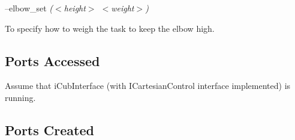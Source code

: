 --elbow\+\_\+set {\itshape ($<$height$>$ $<$weight$>$)}
\begin{DoxyItemize}
\item To specify how to weigh the task to keep the elbow high.
\end{DoxyItemize}\hypertarget{group__karmaToolFinder_portsa_sec}{}\subsection{Ports Accessed}\label{group__karmaToolFinder_portsa_sec}
Assume that i\+Cub\+Interface (with I\+Cartesian\+Control interface implemented) is running.\hypertarget{group__karmaToolProjection_portsc_sec}{}\subsection{Ports Created}\label{group__karmaToolProjection_portsc_sec}


